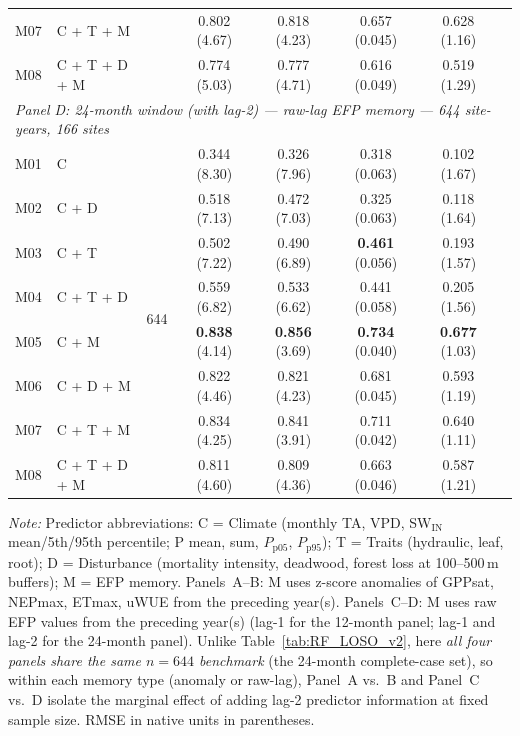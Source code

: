 \begin{table}[htbp]
\begin{tabular}{llcccccc}
M07 & C + T + M         &                      & 0.802 (4.67) & 0.818 (4.23) & 0.657 (0.045) & 0.628 (1.16) \\
M08 & C + T + D + M     &                      & 0.774 (5.03) & 0.777 (4.71) & 0.616 (0.049) & 0.519 (1.29) \\
\midrule
\multicolumn{7}{l}{\textit{Panel D: 24-month window (with lag-2) --- raw-lag EFP memory --- 644 site-years, 166 sites}} \\
\midrule
M01 & C                 & \multirow{8}{*}{644} & 0.344 (8.30) & 0.326 (7.96) & 0.318 (0.063) & 0.102 (1.67) \\
M02 & C + D             &                      & 0.518 (7.13) & 0.472 (7.03) & 0.325 (0.063) & 0.118 (1.64) \\
M03 & C + T             &                      & 0.502 (7.22) & 0.490 (6.89) & \textbf{0.461} (0.056) & 0.193 (1.57) \\
M04 & C + T + D         &                      & 0.559 (6.82) & 0.533 (6.62) & 0.441 (0.058) & 0.205 (1.56) \\
M05 & C + M             &                      & \textbf{0.838} (4.14) & \textbf{0.856} (3.69) & \textbf{0.734} (0.040) & \textbf{0.677} (1.03) \\
M06 & C + D + M         &                      & 0.822 (4.46) & 0.821 (4.23) & 0.681 (0.045) & 0.593 (1.19) \\
M07 & C + T + M         &                      & 0.834 (4.25) & 0.841 (3.91) & 0.711 (0.042) & 0.640 (1.11) \\
M08 & C + T + D + M     &                      & 0.811 (4.60) & 0.809 (4.36) & 0.663 (0.046) & 0.587 (1.21) \\
\bottomrule
\end{tabular}
\vspace{2pt}
\begin{minipage}{\linewidth}
\footnotesize
\textit{Note:} Predictor abbreviations: C = Climate (monthly TA, VPD,
SW$_\mathrm{IN}$ mean/5th/95th percentile; P mean, sum, $P_\mathrm{p05}$,
$P_\mathrm{p95}$); T = Traits (hydraulic, leaf, root); D = Disturbance
(mortality intensity, deadwood, forest loss at 100--500\,m buffers); M = EFP
memory. Panels~A--B: M uses z-score anomalies of GPPsat, NEPmax, ETmax, uWUE
from the preceding year(s). Panels~C--D: M uses raw EFP values from the
preceding year(s) (lag-1 for the 12-month panel; lag-1 and lag-2 for the
24-month panel). Unlike Table~\ref{tab:RF_LOSO_v2}, here \emph{all four
panels share the same $n=644$ benchmark} (the 24-month complete-case set),
so within each memory type (anomaly or raw-lag), Panel~A vs.\ B and Panel~C
vs.\ D isolate the marginal effect of adding lag-2 predictor information at
fixed sample size. RMSE in native units in parentheses.
\end{minipage}
\end{table}
